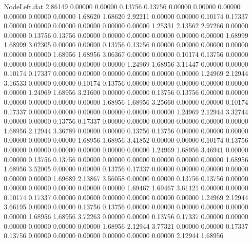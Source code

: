 \begin{filecontents}{NodeLeft.dat}
   2.86149    0.00000    0.00000     0.13756    0.13756    0.00000    0.00000    0.00000    0.00000    0.00000    0.00000    1.68620    1.68620
   2.92211    0.00000    0.00000     0.10174    0.17337    0.00000    0.00000    0.00000    0.00000    0.00000    0.00000    1.25331    2.13562
   2.97266    0.00000    0.00000     0.13756    0.13756    0.00000    0.00000    0.00000    0.00000    0.00000    0.00000    1.68999    1.68999
   3.02305    0.00000    0.00000     0.13756    0.13756    0.00000    0.00000    0.00000    0.00000    0.00000    0.00000    1.68956    1.68956
   3.06367    0.00000    0.00000     0.10174    0.13756    0.00000    0.00000    0.00000    0.00000    0.00000    0.00000    1.24969    1.68956
   3.11447    0.00000    0.00000     0.10174    0.17337    0.00000    0.00000    0.00000    0.00000    0.00000    0.00000    1.24969    2.12944
   3.16533    0.00000    0.00000     0.10174    0.13756    0.00000    0.00000    0.00000    0.00000    0.00000    0.00000    1.24969    1.68956
   3.21600    0.00000    0.00000     0.13756    0.13756    0.00000    0.00000    0.00000    0.00000    0.00000    0.00000    1.68956    1.68956
   3.25660    0.00000    0.00000     0.10174    0.17337    0.00000    0.00000    0.00000    0.00000    0.00000    0.00000    1.24969    2.12944
   3.32744    0.00000    0.00000     0.13756    0.17337    0.00000    0.00000    0.00000    0.00000    0.00000    0.00000    1.68956    2.12944
   3.36789    0.00000    0.00000     0.13756    0.13756    0.00000    0.00000    0.00000    0.00000    0.00000    0.00000    1.68956    1.68956
   3.41852    0.00000    0.00000     0.10174    0.13756    0.00000    0.00000    0.00000    0.00000    0.00000    0.00000    1.24969    1.68956
   3.46941    0.00000    0.00000     0.13756    0.13756    0.00000    0.00000    0.00000    0.00000    0.00000    0.00000    1.68956    1.68956
   3.52005    0.00000    0.00000     0.13756    0.17337    0.00000    0.00000    0.00000    0.00000    0.00000    0.00000    1.69689    2.13867
   3.56058    0.00000    0.00000     0.13756    0.13756    0.00000    0.00000    0.00000    0.00000    0.00000    0.00000    1.69467    1.69467
   3.61121    0.00000    0.00000     0.10174    0.17337    0.00000    0.00000    0.00000    0.00000    0.00000    0.00000    1.24969    2.12944
   3.66195    0.00000    0.00000     0.13756    0.13756    0.00000    0.00000    0.00000    0.00000    0.00000    0.00000    1.68956    1.68956
   3.72263    0.00000    0.00000     0.13756    0.17337    0.00000    0.00000    0.00000    0.00000    0.00000    0.00000    1.68956    2.12944
   3.77321    0.00000    0.00000     0.17337    0.13756    0.00000    0.00000    0.00000    0.00000    0.00000    0.00000    2.12944    1.68956

\end{filecontents}
